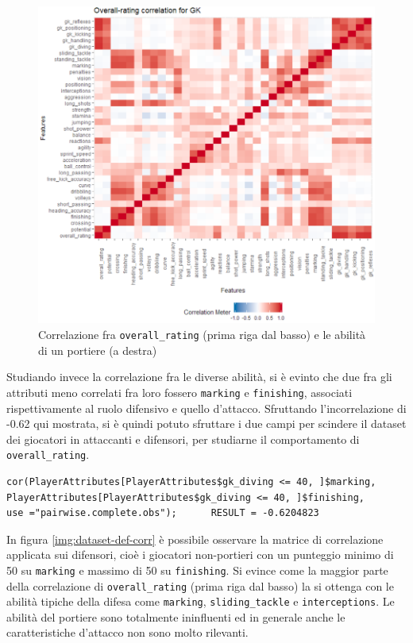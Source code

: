 \documentclass[hidelinks, 12pt]{article}
\begin{document}
\begin{figure}[H]
	\centering
	\includegraphics[scale=0.8]{images/04_03_gk_corr.png}
	\caption[Correlazione fra \texttt{overall\_rating} (prima riga dal basso) e le abilità di un portiere (a destra)]{Correlazione fra \texttt{overall\_rating} (prima riga dal basso) e le abilità di un portiere (a destra)}
	\label{img:dataset-gk-corr}
\end{figure}

Studiando invece la correlazione fra le diverse abilità, si è evinto che due fra gli attributi meno correlati fra loro fossero \texttt{marking} e \texttt{finishing}, associati rispettivamente al ruolo difensivo e quello d'attacco. Sfruttando l'incorrelazione di -0.62 qui mostrata, si è quindi potuto sfruttare i due campi per scindere il dataset dei giocatori in attaccanti e difensori, per studiarne il comportamento di \texttt{overall\_rating}.

\begin{verbatim}
cor(PlayerAttributes[PlayerAttributes$gk_diving <= 40, ]$marking,
PlayerAttributes[PlayerAttributes$gk_diving <= 40, ]$finishing,
use ="pairwise.complete.obs"); 		RESULT = -0.6204823
\end{verbatim}

In figura \ref{img:dataset-def-corr} è possibile osservare la matrice di correlazione applicata sui difensori, cioè i giocatori non-portieri con un punteggio minimo di 50 su \texttt{marking} e massimo di 50 su \texttt{finishing}. Si evince come la maggior parte della correlazione di \texttt{overall\_rating} (prima riga dal basso) la si ottenga con le abilità tipiche della difesa come \texttt{marking}, \texttt{sliding\_tackle} e \texttt{interceptions}. Le abilità del portiere sono totalmente ininfluenti ed in generale anche le caratteristiche d'attacco non sono molto rilevanti.
\end{document}
